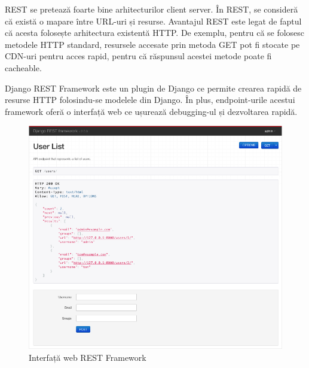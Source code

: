 REST se pretează foarte bine arhitecturilor client server.
În REST, se consideră că există o mapare între URL-uri
și resurse. Avantajul REST este legat de faptul că acesta folosește
arhitectura existentă HTTP. De exemplu, pentru că
se folosesc metodele HTTP standard, resursele accesate
prin metoda GET pot fi stocate pe CDN-uri pentru acces
rapid, pentru că răspunsul acestei metode poate fi cacheable.

Django REST Framework este un plugin de Django
ce permite crearea rapidă de resurse HTTP folosindu-se
modelele din Django. În plus, endpoint-urile acestui framework
oferă o interfață web ce ușurează debugging-ul și dezvoltarea
rapidă.

\begin{figure}[t]
  \centering
    \includegraphics[width=1\textwidth]{./chap4-code/rest_framework}
  \caption{Interfață web REST Framework}
\end{figure}